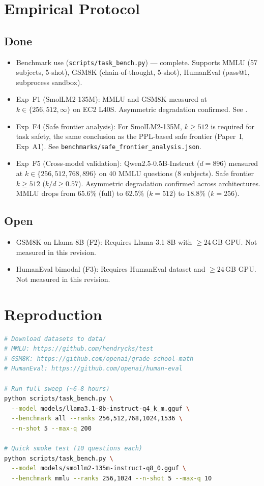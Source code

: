 \documentclass[11pt]{article}
\begin{document}
\section{Empirical Protocol}
\label{sec:protocol}

\subsection{Done}
\begin{itemize}
\item Benchmark use (\texttt{scripts/task\_bench.py}) --- complete.
      Supports MMLU (57 subjects, 5-shot), GSM8K (chain-of-thought,
      5-shot), HumanEval (pass@1, subprocess sandbox).
\item Exp~F1 (SmolLM2-135M): MMLU and GSM8K measured at
      $k\in\{256,512,\infty\}$ on EC2 L40S.  Asymmetric degradation
      confirmed.  See .
\item Exp~F4 (Safe frontier analysis): For SmolLM2-135M,
      $k{\ge}512$ is required for task safety, the same conclusion
      as the PPL-based safe frontier (Paper~I, Exp~A1).
      See \texttt{benchmarks/safe\_frontier\_analysis.json}.
\item Exp~F5 (Cross-model validation): Qwen2.5-0.5B-Instruct
      ($d{=}896$) measured at $k\in\{256,512,768,896\}$ on 40 MMLU
      questions (8 subjects).  Safe frontier $k{\ge}512$
      ($k/d{\ge}0.57$).  Asymmetric degradation confirmed across
      architectures.  MMLU drops from $65.6\%$ (full) to $62.5\%$
      ($k{=}512$) to $18.8\%$ ($k{=}256$).
\end{itemize}

\subsection{Open}
\begin{itemize}
\item GSM8K on Llama-8B (F2): Requires Llama-3.1-8B with
      $\ge 24$\,GB GPU.  Not measured in this revision.
\item HumanEval bimodal (F3): Requires HumanEval dataset
      and $\ge 24$\,GB GPU.  Not measured in this revision.
\end{itemize}

\section{Reproduction}
\label{sec:repro}

\begin{lstlisting}[language=bash]
# Download datasets to data/
# MMLU: https://github.com/hendrycks/test
# GSM8K: https://github.com/openai/grade-school-math
# HumanEval: https://github.com/openai/human-eval

# Run full sweep (~6-8 hours)
python scripts/task_bench.py \
  --model models/llama3.1-8b-instruct-q4_k_m.gguf \
  --benchmark all --ranks 256,512,768,1024,1536 \
  --n-shot 5 --max-q 200

# Quick smoke test (10 questions each)
python scripts/task_bench.py \
  --model models/smollm2-135m-instruct-q8_0.gguf \
  --benchmark mmlu --ranks 256,1024 --n-shot 5 --max-q 10
\end{lstlisting}
\end{document}
